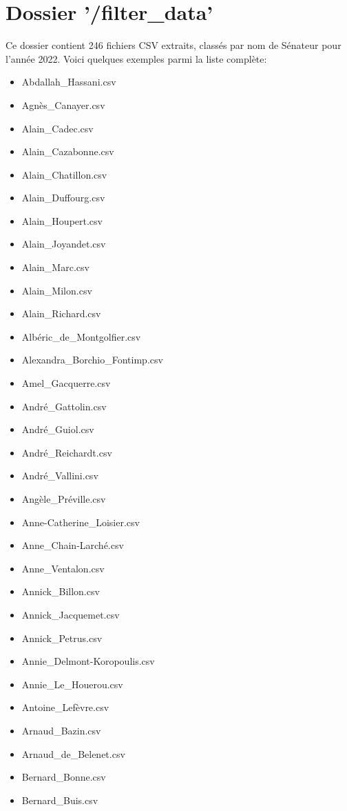 \documentclass[a4paper,12pt,twoside]{book}
\begin{document}
\section*{Dossier '/filter\_data'}
Ce dossier contient 246 fichiers CSV extraits, classés par nom de Sénateur pour l'année 2022. Voici quelques exemples parmi la liste complète:

\begin{itemize}
  \item Abdallah\_Hassani.csv
  \item Agnès\_Canayer.csv
  \item Alain\_Cadec.csv
  \item Alain\_Cazabonne.csv
  \item Alain\_Chatillon.csv
  \item Alain\_Duffourg.csv
  \item Alain\_Houpert.csv
  \item Alain\_Joyandet.csv
  \item Alain\_Marc.csv
  \item Alain\_Milon.csv
  \item Alain\_Richard.csv
  \item Albéric\_de\_Montgolfier.csv
  \item Alexandra\_Borchio\_Fontimp.csv
  \item Amel\_Gacquerre.csv
  \item André\_Gattolin.csv
  \item André\_Guiol.csv
  \item André\_Reichardt.csv
  \item André\_Vallini.csv
  \item Angèle\_Préville.csv
  \item Anne-Catherine\_Loisier.csv
  \item Anne\_Chain-Larché.csv
  \item Anne\_Ventalon.csv
  \item Annick\_Billon.csv
  \item Annick\_Jacquemet.csv
  \item Annick\_Petrus.csv
  \item Annie\_Delmont-Koropoulis.csv
  \item Annie\_Le\_Houerou.csv
  \item Antoine\_Lefèvre.csv
  \item Arnaud\_Bazin.csv
  \item Arnaud\_de\_Belenet.csv
  \item Bernard\_Bonne.csv
  \item Bernard\_Buis.csv

\end{itemize}
\end{document}

